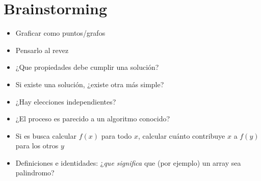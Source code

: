 

\def\title{Notebook}
\tableofcontents\newpage















\section{Brainstorming}
    \begin{itemize}
        \item Graficar como puntos/grafos
        \item Pensarlo al revez
        \item ¿Que propiedades debe cumplir una solución?
        \item Si existe una solución, ¿existe otra más simple?
        \item ¿Hay elecciones independientes?
        \item ¿El proceso es parecido a un algoritmo conocido?
        \item Si es busca calcular $f(x)$ para todo $x$, calcular cuánto contribuye $x$ a $f(y)$ para los otros $y$
        \item Definiciones e identidades: ¿\textit{que significa} que (por ejemplo) un array sea palindromo?
    \end{itemize}


